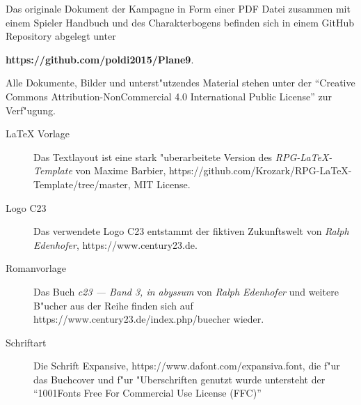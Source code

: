 \newpage
\pagestyle{empty}



Das originale  Dokument der Kampagne in Form einer PDF Datei zusammen mit einem Spieler Handbuch und des Charakterbogens
befinden sich in einem GitHub Repository abgelegt unter 

\textbf{https://github.com/poldi2015/Plane9}. 

Alle Dokumente, Bilder und unterst"utzendes Material stehen unter der ``Creative Commons Attribution-NonCommercial 4.0 
International Public License'' zur Verf"ugung.


\begin{description}
    \item [LaTeX Vorlage] Das Textlayout ist eine stark "uberarbeitete Version des \textit{RPG-LaTeX-Template} von 
        Maxime Barbier, https://github.com/Krozark/RPG-LaTeX-Template/tree/master, MIT License.
    \item [Logo C23] Das verwendete Logo C23 entstammt der fiktiven Zukunftswelt von \emph{Ralph  Edenhofer}, 
        \newline{}https://www.century23.de.
    \item [Romanvorlage] Das Buch \emph{c23 --- Band 3, in abyssum} von \emph{Ralph Edenhofer} und weitere B"ucher aus der Reihe finden 
        sich auf https://www.century23.de/index.php/buecher wieder.
    \item [Schriftart] Die Schrift Expansive, https://www.dafont.com/expansiva.font, die f"ur das Buchcover und f"ur
        "Uberschriften genutzt wurde untersteht der ``1001Fonts Free For Commercial Use License (FFC)''
\end{description}